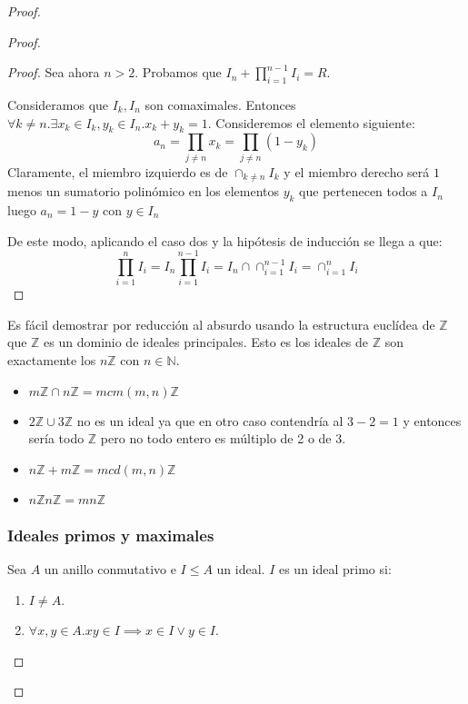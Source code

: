 \begin{proof}
\begin{proof}
\begin{proof}
	Sea ahora $n > 2$. Probamos que $I_n + \prod_{i = 1}^{n-1} I_i = R$.

	Consideramos que $I_k,I_n$ son comaximales. Entonces $\forall k \neq n. \exists x_k \in I_k,y_k \in I_n. x_k+y_k = 1$. Consideremos el elemento siguiente: $$a_n =  \prod_{j \neq n} x_k = \prod_{j \neq n} (1-y_k)$$ Claramente, el miembro izquierdo es de $\cap_{k \neq n} I_k$ y el miembro derecho será $1$ menos un sumatorio polinómico en los elementos $y_k$ que pertenecen todos a $I_n$ luego $a_n = 1-y$ con $y \in I_n$
	
	De este modo, aplicando el caso dos y la hipótesis de inducción se llega a que: $$\prod_{i = 1}^{n} I_i = I_n\prod_{i = 1}^{n-1} I_i = I_n \cap \cap_{i = 1}^{n-1} I_i = \cap_{i = 1}^n I_i$$
\end{proof}

\begin{example}
	Es fácil demostrar por reducción al absurdo usando la estructura euclídea de $\mathbb{Z}$ que $\mathbb{Z}$ es un dominio de ideales principales. Esto es los ideales de $\mathbb{Z}$ son exactamente los $n\mathbb{Z}$ con $n \in \mathbb{N}$.
	
	\begin{itemize}
		\item $m\mathbb{Z} \cap n\mathbb{Z} = mcm(m,n)\mathbb{Z}$
		\item $2\mathbb{Z} \cup 3\mathbb{Z}$ no es un ideal ya que en otro caso contendría al $3-2 = 1$ y entonces sería todo $\mathbb{Z}$ pero no todo entero es múltiplo de 2 o de 3. 
		\item $n\mathbb{Z}+m\mathbb{Z} = mcd(m,n)\mathbb{Z}$
		\item $n\mathbb{Z}n\mathbb{Z} = mn\mathbb{Z}$
	\end{itemize}
\end{example}

\subsubsection{Ideales primos y maximales}

\begin{definition}
Sea $A$ un anillo conmutativo e $I \le A$ un ideal. $I$ es un ideal primo si:

\begin{enumerate}
\item $I \neq A$.
\item $\forall x,y \in A.xy \in I \implies x \in I \lor y \in I$. 
\end{enumerate}
\end{definition}


\end{proof}
\end{proof}
